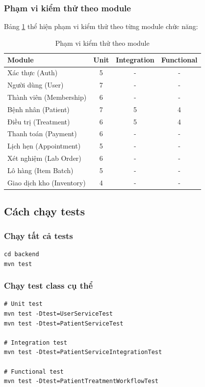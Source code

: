\subsubsection{Phạm vi kiểm thử theo module}

Bảng \ref{tab:coverage-by-module} thể hiện phạm vi kiểm thử theo từng module chức năng:

\begin{table}[h]
\centering
\caption{Phạm vi kiểm thử theo module}
\label{tab:coverage-by-module}
\begin{tabular}{|l|c|c|c|}
\hline
\textbf{Module} & \textbf{Unit} & \textbf{Integration} & \textbf{Functional} \\
\hline
Xác thực (Auth) & 5 & - & - \\
Người dùng (User) & 7 & - & - \\
Thành viên (Membership) & 6 & - & - \\
Bệnh nhân (Patient) & 7 & 5 & 4 \\
Điều trị (Treatment) & 6 & 5 & 4 \\
Thanh toán (Payment) & 6 & - & - \\
Lịch hẹn (Appointment) & 5 & - & - \\
Xét nghiệm (Lab Order) & 6 & - & - \\
Lô hàng (Item Batch) & 5 & - & - \\
Giao dịch kho (Inventory) & 4 & - & - \\
\hline
\end{tabular}
\end{table}

\subsection{Cách chạy tests}

\subsubsection{Chạy tất cả tests}

\begin{verbatim}
cd backend
mvn test
\end{verbatim}

\subsubsection{Chạy test class cụ thể}

\begin{verbatim}
# Unit test
mvn test -Dtest=UserServiceTest
mvn test -Dtest=PatientServiceTest

# Integration test
mvn test -Dtest=PatientServiceIntegrationTest

# Functional test
mvn test -Dtest=PatientTreatmentWorkflowTest
\end{verbatim}

